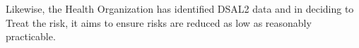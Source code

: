 \begin{minipage}[t]{0.79\textwidth}
  Likewise, the Health Organization has identified DSAL2 data and in deciding to Treat the risk, it aims to ensure risks are reduced as low as reasonably practicable. 
\end{minipage}
\begin{minipage}[t]{0.2\textwidth}
  \centering{}
\end{minipage}


